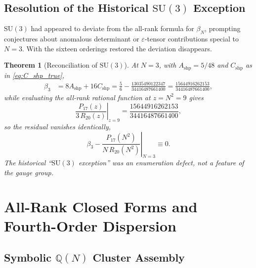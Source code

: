 \documentclass[11pt,a4paper]{article}
\newtheorem{theorem}{Theorem}[section]
\theoremstyle{definition}
\newcommand{\Q}{\mathbb{Q}}
\newcommand{\SU}{\mathrm{SU}}
\newcommand{\Ashp}{A_{\mathrm{shp}}}
\newcommand{\Cshp}{C_{\mathrm{shp}}}
\begin{document}
\subsection{Resolution of the Historical \texorpdfstring{$\SU(3)$}{SU(3)} Exception}

$\SU(3)$ had appeared to deviate from the all-rank formula for $\beta_N$, prompting conjectures about anomalous determinant or $\varepsilon$-tensor contributions special to $N=3$. With the sixteen orderings restored the deviation disappears.

\begin{theorem}[Reconciliation of $\SU(3)$]\label{thm:su3_reconciliation}
At $N=3$, with $\Ashp = 5/48$ and $\Cshp$ as in \eqref{eq:C_shp_true},
\begin{align}\label{eq:beta3_match}
  \beta_3 &= 8\Ashp + 16\Cshp = \frac{5}{6} - \frac{13035490122347}{34416487661400} = \frac{15644916262153}{34416487661400},
\end{align}
while evaluating the all-rank rational function at $z = N^2 = 9$ gives
\begin{equation}
  \left.\frac{P_{17}(z)}{3\,R_{20}(z)}\right|_{z=9} = \frac{15644916262153}{34416487661400},
\end{equation}
so the residual vanishes identically,
\begin{equation}
  \beta_3 - \left.\frac{P_{17}(N^2)}{N\,R_{20}(N^2)}\right|_{N=3} \equiv 0 .
\end{equation}
The historical ``$\SU(3)$ exception'' was an enumeration defect, not a feature of the gauge group.
\end{theorem}

\section{All-Rank Closed Forms and Fourth-Order Dispersion}\label{sec:dispersion}

\subsection{Symbolic \texorpdfstring{$\Q(N)$}{Q(N)} Cluster Assembly}
\end{document}

